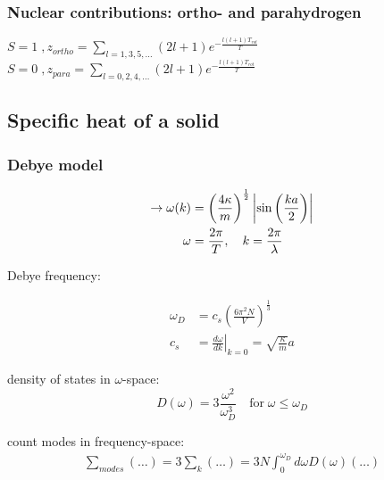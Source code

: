 \subsubsection*{Nuclear contributions: ortho- and parahydrogen}
$S=1 \; , z_{ortho} = \sum_{l=1,3,5,\dots} (2l +1) e^{- \frac{l(l+1) T_{rot}}{T}}$ \\
$S=0 \; , z_{para} = \sum_{l=0,2,4,\dots} (2l +1) e^{- \frac{l(l+1) T_{rot}}{T}}$

\subsection*{Specific heat of a solid}
\subsubsection*{Debye model}

\begin{equation*}
    \begin{aligned}
        \rightarrow \omega(k) &= \left(\frac{4 \kappa}{m}\right)^{\frac{1}{2}} \left\vert\sin \left(\frac{ka}{2}\right)\right\vert \\
        \omega &= \frac{2 \pi}{T}, \quad k = \frac{2 \pi}{\lambda} \\
    \end{aligned}
\end{equation*}

Debye frequency:

\begin{equation*}
    \begin{aligned}
        \omega_D &= c_s \left(\frac{6 \pi^2 N}{V}\right)^{\frac{1}{3}} \\
        c_s &= \left. \frac{d\omega}{dk} \right|_{k=0} = \sqrt{\frac{\kappa}{m}}a
    \end{aligned}
\end{equation*}

density of states in $\omega$-space:
\begin{equation*}
    D(\omega) = 3 \frac{\omega^2}{\omega_D^3} \quad \text{for} \; \omega \leq \omega_D
\end{equation*}

count modes in frequency-space:
\begin{equation*}
    \begin{aligned}
        \sum_{modes} (\dots) = 3 \sum_k (\dots) = 3N \int_0^{\omega_D} d\omega D(\omega) (\dots)
    \end{aligned}
\end{equation*}

